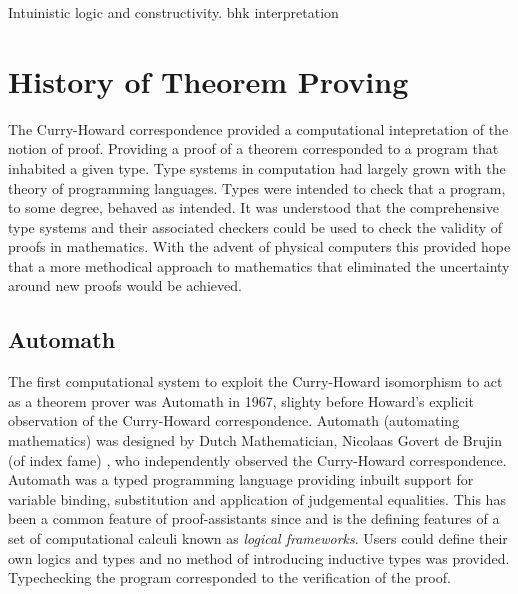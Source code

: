 Intuinistic logic and constructivity. bhk interpretation

\section{History of Theorem Proving}
The Curry-Howard correspondence provided a computational intepretation of the
notion of proof. Providing a proof of a theorem corresponded to a program that
inhabited a given type. Type systems in computation had largely grown with the
theory of programming languages. Types were intended to check that a program, to
some degree, behaved as intended. It was understood that the comprehensive type
systems and their associated checkers could be used to check the validity of
proofs in mathematics. With the advent of physical computers this provided hope
that a more methodical approach to mathematics that eliminated the uncertainty
around new proofs would be achieved.
\subsection{Automath}
The first computational system to exploit the Curry-Howard isomorphism to act as
a theorem prover was Automath in 1967, slighty before Howard's explicit
observation of the Curry-Howard correspondence. Automath (automating
mathematics) was designed by Dutch Mathematician, Nicolaas Govert de Brujin (of
index fame) \cite{de1983automath}, who independently observed the Curry-Howard correspondence.
Automath was a typed programming language providing inbuilt support for variable
binding, substitution and application of judgemental equalities. This has been
a common feature of proof-assistants since and is the defining features of
a set of computational calculi known as \textit{logical frameworks}. Users could
define their own logics and types and no method of introducing inductive types
was provided. Typechecking the program corresponded to the verification of the
proof. 

